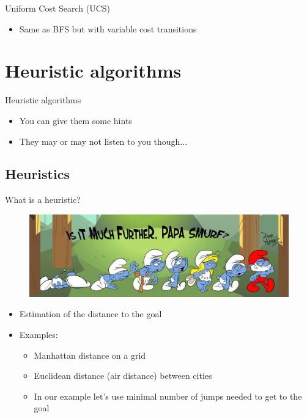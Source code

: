 \documentclass{beamer}
\begin{document}
\begin{frame}{Uniform Cost Search (UCS)}
	\begin{itemize}
		\item Same as BFS but with variable cost transitions
	\end{itemize}				
\end{frame}

\section{Heuristic algorithms}

\begin{frame}{Heuristic algorithms}

	\begin{itemize}
		\item You can give them some hints
		\pause
		\item They may or may not listen to you though...
	\end{itemize}

\end{frame}

\subsection{Heuristics}

\begin{frame}{What is a heuristic?}
	\begin{figure}
	\centering
		\includegraphics[width=\linewidth]{are_we_there_yet.jpg}
	\end{figure}

	\begin{itemize}
		\item Estimation of the distance to the goal
		\item Examples:
		\begin{itemize}
			\pause
			\item Manhattan distance on a grid
			\pause
			\item Euclidean distance (air distance) between cities
			\pause
			\item In our example let's use minimal number of jumps needed to get to the goal
		\end{itemize}
	\end{itemize}
\end{frame}
\end{document}
